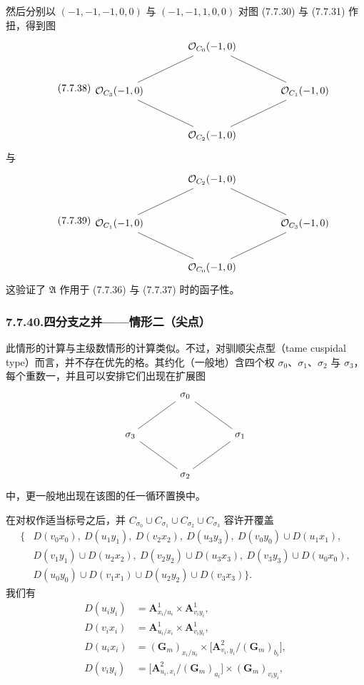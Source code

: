 然后分别以 $(-1,-1,-1,0,0)$ 与 $(-1,-1,1,0,0)$ 对图 (7.7.30) 与 (7.7.31) 作扭，得到图
\begin{equation}\tag{7.7.38}
\begin{tikzcd}[column sep=large,row sep=large]
& \OO_{C_0}(-1,0)\arrow[dl,no head]\arrow[dr,no head] & \\
\OO_{C_3}(-1,0)\arrow[dr,no head] & & \OO_{C_1}(-1,0)\arrow[dl,no head]\\
& \OO_{C_2}(-1,0) &
\end{tikzcd}
\end{equation}
与
\begin{equation}\tag{7.7.39}
\begin{tikzcd}[column sep=large,row sep=large]
& \OO_{C_2}(-1,0)\arrow[dl,no head]\arrow[dr,no head] & \\
\OO_{C_1}(-1,0)\arrow[dr,no head] & & \OO_{C_3}(-1,0)\arrow[dl,no head]\\
& \OO_{C_0}(-1,0) &
\end{tikzcd}
\end{equation}
这验证了 $\mathfrak A$ 作用于 (7.7.36) 与 (7.7.37) 时的函子性。

\subsubsection*{7.7.40.\quad 四分支之并——情形二（尖点）}
此情形的计算与主级数情形的计算类似。不过，对驯顺尖点型（tame cuspidal type）而言，并不存在优先的格。其约化（一般地）含四个权 $\sigma_0$、$\sigma_1$、$\sigma_2$ 与 $\sigma_3$，每个重数一，并且可以安排它们出现在扩展图
\[
\begin{tikzcd}[column sep=large,row sep=large]
& \sigma_0\arrow[dl,no head]\arrow[dr,no head] & \\
\sigma_3\arrow[dr,no head] & & \sigma_1\arrow[dl,no head]\\
& \sigma_2 &
\end{tikzcd}
\]
中，更一般地出现在该图的任一循环置换中。

在对权作适当标号之后，并 $C_{\sigma_0}\cup C_{\sigma_1}\cup C_{\sigma_2}\cup C_{\sigma_3}$ 容许开覆盖
\begin{equation}\tag{7.7.41}
\begin{aligned}
\bigl\{&D(v_0x_0),\ D(u_1y_1),\ D(v_2x_2),\ D(u_3y_3),\ D(v_0y_0)\cup D(u_1x_1),\\
&D(v_1y_1)\cup D(u_2x_2),\ D(v_2y_2)\cup D(u_3x_3),\ D(v_3y_3)\cup D(u_0x_0),\\
&D(u_0y_0)\cup D(v_1x_1)\cup D(u_2y_2)\cup D(v_3x_3)\bigr\}.
\end{aligned}
\end{equation}
我们有
\[
\begin{aligned}
D(u_iy_i)&=\mathbf A^1_{x_i/u_i}\times\mathbf A^1_{v_iy_i},\\
D(v_ix_i)&=\mathbf A^1_{u_i/x_i}\times\mathbf A^1_{v_iy_i},\\
D(u_ix_i)&=(\mathbf G_m)_{x_i/u_i}\times\bigl[\mathbf A^2_{v_i,y_i}/(\mathbf G_m)_{b_i}\bigr],\\
D(v_iy_i)&=\bigl[\mathbf A^2_{u_i,x_i}/(\mathbf G_m)_{a_i}\bigr]\times(\mathbf G_m)_{v_iy_i},
\end{aligned}
\]

